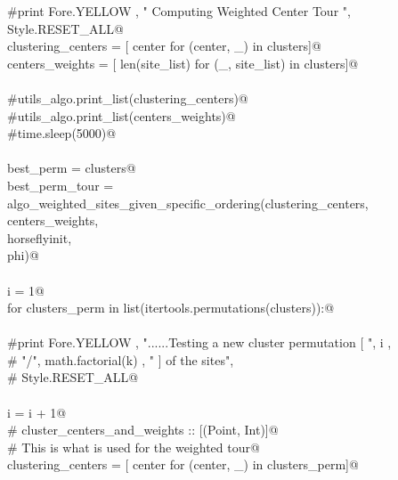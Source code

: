 \documentclass[11.5pt]{report}
\begin{document}
\begin{flushleft}
\begin{list}{}{}
\mbox{}\verb@         #print Fore.YELLOW , " Computing Weighted Center Tour ", Style.RESET_ALL@\\
\mbox{}\verb@         clustering_centers = [ center          for (center, _)    in clusters]@\\
\mbox{}\verb@         centers_weights   =  [ len(site_list)  for (_, site_list) in clusters]@\\
\mbox{}\verb@@\\
\mbox{}\verb@         #utils_algo.print_list(clustering_centers)@\\
\mbox{}\verb@         #utils_algo.print_list(centers_weights)@\\
\mbox{}\verb@         #time.sleep(5000)@\\
\mbox{}\verb@@\\
\mbox{}\verb@         best_perm = clusters@\\
\mbox{}\verb@         best_perm_tour = algo_weighted_sites_given_specific_ordering(clustering_centers, \@\\
\mbox{}\verb@                                                               centers_weights, \@\\
\mbox{}\verb@                                                               horseflyinit, \@\\
\mbox{}\verb@                                                               phi)@\\
\mbox{}\verb@@\\
\mbox{}\verb@         i = 1@\\
\mbox{}\verb@         for clusters_perm in list(itertools.permutations(clusters)):@\\
\mbox{}\verb@@\\
\mbox{}\verb@               #print Fore.YELLOW , "......Testing a new cluster permutation [ ", i ,  \@\\
\mbox{}\verb@               #                     "/", math.factorial(k) , " ] of the sites", \@\\
\mbox{}\verb@               #                    Style.RESET_ALL@\\
\mbox{}\verb@@\\
\mbox{}\verb@               i = i + 1@\\
\mbox{}\verb@               # cluster_centers_and_weights ::  [(Point, Int)]@\\
\mbox{}\verb@               # This is what is used for the weighted tour@\\
\mbox{}\verb@               clustering_centers = [ center          for (center, _)    in clusters_perm]@\\

\end{list}
\end{flushleft}
\end{document}
